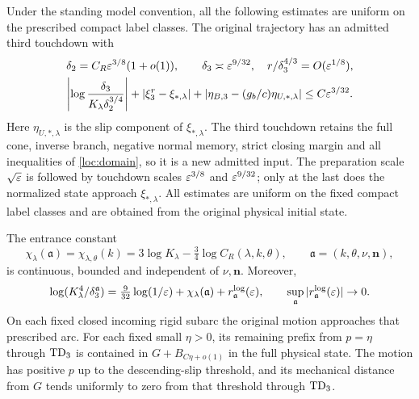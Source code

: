 \begin{proposition}
\label{loc:entrance}
Under the standing model convention, all the following estimates are
uniform on the prescribed compact label classes.
The original trajectory has an admitted third touchdown with
\begin{equation}
 \begin{gathered}
 \delta_2=C_R\varepsilon^{3/8}(1+o(1)),\qquad
 \delta_3\asymp\varepsilon^{9/32},\quad
 r/\delta_3^{4/3}=O(\varepsilon^{1/8}),\\
 \left|\log\frac{\delta_3}{K_\lambda\delta_2^{3/4}}\right|
 +|\xi_3^r-\xi_{*,\lambda}|+
 |\eta_{B,3}-(g_b/c)\eta_{U,*,\lambda}|
 \le C\varepsilon^{3/32}.
 \label{loc:third-entry}
 \end{gathered}
\end{equation}
Here $\eta_{U,*,\lambda}$ is the slip component of $\xi_{*,\lambda}$.
The third touchdown retains the full cone, inverse branch, negative
normal memory, strict closing margin and all inequalities of
\eqref{loc:domain}, so it is a new admitted input. The preparation scale
$\sqrt{\varepsilon}$ is followed by touchdown scales $\varepsilon^{3/8}$ and
$\varepsilon^{9/32}$; only at the last does the normalized state approach
$\xi_{*,\lambda}$.
All estimates are uniform on the fixed compact label classes and
are obtained from the original physical initial state.


The entrance constant
\begin{equation}
 \chi_\lambda(\mathfrak a)=\chi_{\lambda,\theta}(k)
   =3\log K_\lambda-\tfrac34\log C_R(\lambda,k,\theta),
 \qquad \mathfrak a=(k,\theta,\nu,\mathbf n),
 \label{sel:chi}
\end{equation}
is continuous, bounded and independent of $\nu,\mathbf n$. Moreover,
\begin{equation}
 \log(K_\lambda^4/\delta_3^{\mathfrak a})
 =\tfrac9{32}\log(1/\varepsilon)+\chi_\lambda(\mathfrak a)
                      +r_{\mathfrak a}^{\log}(\varepsilon),
 \qquad \sup_{\mathfrak a}|r_{\mathfrak a}^{\log}(\varepsilon)|\to0.
 \label{loc:log-entry}
\end{equation}
On each fixed closed incoming rigid subarc the original motion
approaches that prescribed arc. For each fixed small $\eta>0$,
its remaining prefix from $p=\eta$ through $\mathrm{TD}_3$ is contained in
$G+B_{C\eta+o(1)}$ in the full physical state. The motion has positive
$p$ up to the descending-slip threshold, and its mechanical distance
from $G$ tends uniformly to zero from that threshold through $\mathrm{TD}_3$.
\end{proposition}
